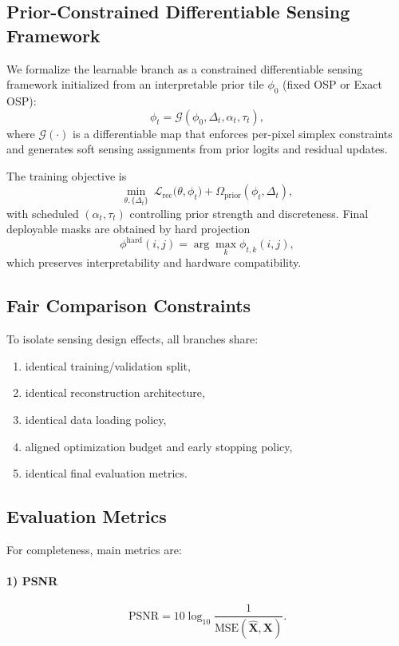 \documentclass[journal]{IEEEtran}
\begin{document}
\subsection{Prior-Constrained Differentiable Sensing Framework}
We formalize the learnable branch as a constrained differentiable sensing framework initialized from an interpretable prior tile $\phi_0$ (fixed OSP or Exact OSP):
\begin{equation}
\phi_t=\mathcal{G}(\phi_0,\Delta_t,\alpha_t,\tau_t),
\end{equation}
where $\mathcal{G}(\cdot)$ is a differentiable map that enforces per-pixel simplex constraints and generates soft sensing assignments from prior logits and residual updates.

The training objective is
\begin{equation}
\min_{\theta,\{\Delta_t\}}\ \mathcal{L}_{\mathrm{rec}}\big(\theta,\phi_t\big)+\Omega_{\mathrm{prior}}(\phi_t,\Delta_t),
\end{equation}
with scheduled $(\alpha_t,\tau_t)$ controlling prior strength and discreteness. Final deployable masks are obtained by hard projection
\begin{equation}
\phi^{\mathrm{hard}}(i,j)=\arg\max_k\phi_{t,k}(i,j),
\end{equation}
which preserves interpretability and hardware compatibility.

\subsection{Fair Comparison Constraints}
To isolate sensing design effects, all branches share:
\begin{enumerate}
\item identical training/validation split,
\item identical reconstruction architecture,
\item identical data loading policy,
\item aligned optimization budget and early stopping policy,
\item identical final evaluation metrics.
\end{enumerate}

\subsection{Evaluation Metrics}
For completeness, main metrics are:

\paragraph{1) PSNR}
\begin{equation}
\mathrm{PSNR}=10\log_{10}\frac{1}{\mathrm{MSE}(\hat{\mathbf{X}},\mathbf{X})}.
\end{equation}
\end{document}
